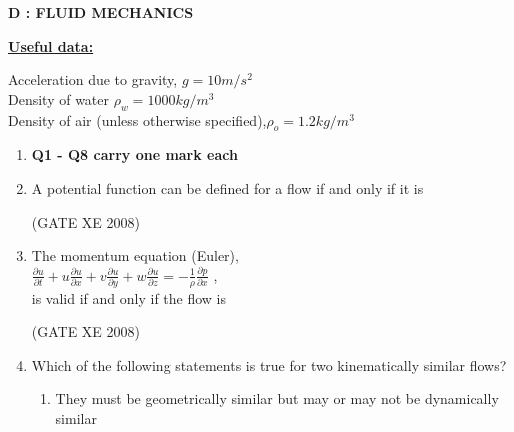 \documentclass[12pt]{article}
\begin{document}
\newpage
\begin{center}
    \textbf{D : FLUID MECHANICS}
\end{center}

 \textbf{\underline{Useful data:}}
 \begin{center}
     Acceleration due to gravity, $g =10 m/s^{2}$\\
Density of water $\rho _{w} = 1000 kg/m^{3}$\\
Density of air (unless otherwise specified),$ \rho _{o}=1.2kg/m^{3}$
 \end{center}

\begin{enumerate}
\item[] \textbf{Q1 - Q8 carry one mark each}

\item A potential function can be defined for a flow if and only if it is

\begin{enumerate}
\end{enumerate}


(GATE XE 2008)
\item The momentum equation (Euler),\\
$\frac{\partial u}{\partial t}+ u \frac{\partial u}{\partial x}+v\frac{\partial u}{\partial y}+w\frac{\partial u}{\partial z} = -\frac{1}{\rho} \frac{\partial p}{\partial x}$ ,\\
is valid if and only if the flow is

\begin{enumerate}
\end{enumerate}

(GATE XE 2008)
\item Which of the following statements is true for two kinematically similar flows?

\begin{enumerate}
\item  They must be geometrically similar but may or may not be dynamically similar


\end{enumerate}
\end{enumerate}
\end{document}
